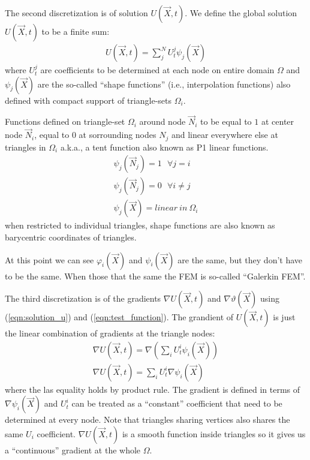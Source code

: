 \documentclass{birkjour}
\numberwithin{equation}{section}
\begin{document}
The second discretization is of solution $U(\vec X, t)$. We define the global solution $U(\vec X, t)$ to be a finite sum:
\begin{eqnarray}
	\label{eqn:solution_u}
	U(\vec X, t) = \sum_j^N{ U_t^j \psi_j(\vec X) }
\end{eqnarray}
where $U_t^j$ are coefficients to be determined at each node on entire domain $\Omega$ and $\psi_j(\vec X)$ are the 
so-called ``shape functions'' (i.e., interpolation functions) also defined with compact support of triangle-sets $\Omega_i$.

Functions defined on triangle-set $\Omega_i$ around node $\vec N_i$ to be equal to $1$ at center node $\vec N_i$, equal to $0$ at 
sorrounding nodes $N_j$ and linear everywhere else at triangles in $\Omega_i$ a.k.a., a tent function also known as P1 linear functions.
\begin{eqnarray}
	\psi_j(\vec N_j) = 1 \ \ \  \forall j = i  \nonumber\\
	\psi_j(\vec N_j) = 0 \ \ \  \forall i \neq j \nonumber\\
	\psi_j(\vec X) = linear \ in \ \Omega_i \nonumber
\end{eqnarray}
when restricted to individual triangles, shape functions are also known as barycentric coordinates of triangles.

At this point we can see $\varphi_i(\vec X)$ and $\psi_i(\vec X)$ are the same, but they don't have to be the same. 
When those that the same the FEM is so-called ``Galerkin FEM''. 

The third discretization is of the gradients $\nabla U(\vec X, t)$ and $\nabla \vartheta(\vec X)$ 
using (\ref{eqn:solution_u}) and (\ref{eqn:test_function}). The grandient of $U(\vec X, t)$ 
is just the linear combination of gradients at the triangle nodes:
\begin{eqnarray}
	\label{eqn:gradient_u}
	\nabla U(\vec X, t) = \nabla \left(\sum_i {U_t^i \psi_i(\vec X)} \right) \nonumber\\
	\nabla U(\vec X, t) = \sum_i { U_t^i \nabla \psi_i(\vec X) }
\end{eqnarray}
where the las equality holds by product rule. The gradient is defined in terms of $\nabla \psi_i(\vec X)$ and 
$U_t^i$ can be treated as a ``constant'' coefficient 
that need to be determined at every node. Note that triangles sharing vertices also shares the same $U_i$ coefficient. 
$\nabla U(\vec X, t)$ is a smooth function inside triangles so it gives us a ``continuous'' gradient at the whole $\Omega$.
\end{document}
